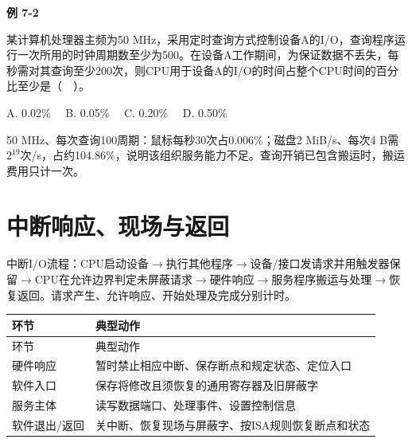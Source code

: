 \par\medskip{}\noindent\hypertarget{CO07-E02}{}\label{CO07-E02}\textbf{例 7-2}\par\nobreak\smallskip

某计算机处理器主频为50 MHz，采用定时查询方式控制设备A的I/O，查询程序运行一次所用的时钟周期数至少为500。在设备A工作期间，为保证数据不丢失，每秒需对其查询至少200次，则CPU用于设备A的I/O的时间占整个CPU时间的百分比至少是（　）。

A. 0.02\%　 B. 0.05\%　 C. 0.20\%　 D. 0.50\%

50 MHz、每次查询100周期：鼠标每秒30次占0.006\%；磁盘2 MiB/s、每次4 B需\(2^{19}\)次/s，占约104.86\%，说明该组织服务能力不足。查询开销已包含搬运时，搬运费用只计一次。

\section{中断响应、现场与返回}\label{CO07-service}

中断I/O流程：CPU启动设备\ensuremath{\to}执行其他程序\ensuremath{\to}设备/接口发请求并用触发器保留\ensuremath{\to}CPU在允许边界判定未屏蔽请求\ensuremath{\to}硬件响应\ensuremath{\to}服务程序搬运与处理\ensuremath{\to}恢复返回。请求产生、允许响应、开始处理及完成分别计时。

\par\smallskip
{\fontsize{9.3}{12}\selectfont\setlength{\tabcolsep}{2.5pt}\setlength{\LTleft}{0pt}\setlength{\LTright}{0pt}
\begin{longtable}{@{}>{\raggedright\arraybackslash}p{}>{\raggedright\arraybackslash}p{}@{}}
\toprule
环节 & 典型动作 \\

\midrule\endfirsthead\toprule
环节 & 典型动作 \\

\midrule\endhead\bottomrule\endfoot
硬件响应 & 暂时禁止相应中断、保存断点和规定状态、定位入口 \\

软件入口 & 保存将修改且须恢复的通用寄存器及旧屏蔽字 \\

服务主体 & 读写数据端口、处理事件、设置控制信息 \\

软件退出/返回 & 关中断、恢复现场与屏蔽字、按ISA规则恢复断点和状态 \\

\end{longtable}}
\par\smallskip

